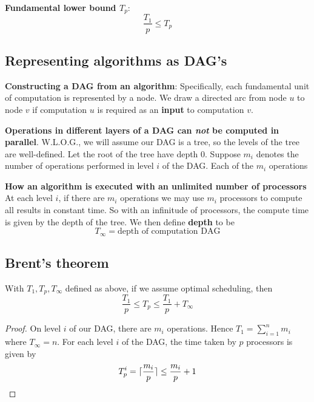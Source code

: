 \documentclass[11pt]{article}
\begin{document}
\textbf{Fundamental lower bound \(T_p\)}:
\begin{equation*}
\frac{T_1}{p}\le T_p
\end{equation*}
\subsection{Representing algorithms as DAG's}
\label{sec:org095ce42}
\textbf{Constructing a DAG from an algorithm}: Specifically, each fundamental unit of computation is
represented by a node. We draw a directed arc from node \(u\) to node \(v\) if
computation \(u\) is required as an \textbf{input} to computation \(v\).

\textbf{Operations in different layers of a DAG can \emph{not} be computed in parallel}. W.L.O.G., we will
assume our DAG is a tree, so the levels of the tree are well-defined. Let the root of the tree
have depth 0. Suppose \(m_i\) denotes the number of operations performed in level \(i\) of the
DAG. Each of the \(m_i\) operations

\textbf{How an algorithm is executed with an unlimited number of processors} At each level \(i\), if
there are \(m_i\) operations we may use \(m_i\) processors to compute all results in constant
time. So with an infinitude of processors, the compute time is given by the depth of the tree.
We then define \textbf{depth} to be
 \begin{equation*}
T_\infty=\text{depth of computation DAG}
 \end{equation*}
\subsection{Brent's theorem}
\label{sec:org0a0731e}
\begin{theorem}[]
With \(T_1,T_p,T_\infty\) defined as above, if we assume optimal scheduling, then
\begin{equation*}
\frac{T_1}{p}\le T_p\le \frac{T_1}{p}+T_\infty
\end{equation*}
\end{theorem}

\begin{proof}
On level \(i\) of our DAG, there are \(m_i\) operations. Hence \(T_1=\sum_{i=1}^nm_i\) where \(T_\infty=n\).
For each level \(i\) of the DAG, the time taken by \(p\) processors is given by
\begin{equation*}
T_p^i=\lceil \frac{m_i}{p} \rceil\le\frac{m_i}{p}+1
\end{equation*}
\end{proof}
\end{document}
